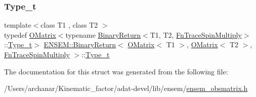 \subsubsection{\texorpdfstring{Type\_t}{Type\_t}\hspace{0.1cm}{\footnotesize\ttfamily [3/3]}}
{\footnotesize\ttfamily template$<$class T1 , class T2 $>$ \\
typedef \mbox{\hyperlink{classENSEM_1_1OMatrix}{O\+Matrix}}$<$typename \mbox{\hyperlink{structENSEM_1_1BinaryReturn}{Binary\+Return}}$<$T1, T2, \mbox{\hyperlink{structENSEM_1_1FnTraceSpinMultiply}{Fn\+Trace\+Spin\+Multiply}}$>$\+::\mbox{\hyperlink{structENSEM_1_1BinaryReturn_3_01OMatrix_3_01T1_01_4_00_01OMatrix_3_01T2_01_4_00_01FnTraceSpinMultiply_01_4_a3c030373855e8dde629b2051471b5d72}{Type\+\_\+t}}$>$ \mbox{\hyperlink{structENSEM_1_1BinaryReturn}{E\+N\+S\+E\+M\+::\+Binary\+Return}}$<$ \mbox{\hyperlink{classENSEM_1_1OMatrix}{O\+Matrix}}$<$ T1 $>$, \mbox{\hyperlink{classENSEM_1_1OMatrix}{O\+Matrix}}$<$ T2 $>$, \mbox{\hyperlink{structENSEM_1_1FnTraceSpinMultiply}{Fn\+Trace\+Spin\+Multiply}} $>$\+::\mbox{\hyperlink{structENSEM_1_1BinaryReturn_3_01OMatrix_3_01T1_01_4_00_01OMatrix_3_01T2_01_4_00_01FnTraceSpinMultiply_01_4_a3c030373855e8dde629b2051471b5d72}{Type\+\_\+t}}}



The documentation for this struct was generated from the following file\+:\begin{DoxyCompactItemize}
\item 
/\+Users/archanar/\+Kinematic\+\_\+factor/adat-\/devel/lib/ensem/\mbox{\hyperlink{adat-devel_2lib_2ensem_2ensem__obsmatrix_8h}{ensem\+\_\+obsmatrix.\+h}}\end{DoxyCompactItemize}
